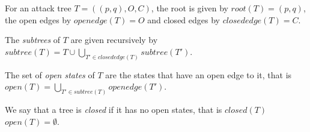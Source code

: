 \begin{definition}
  For an attack tree $T = ((p,q),O,C)$, the root is given by $root(T) = (p,q)$,
  the open edges by $openedge(T) = O$ and closed edges by $closededge(T) = C$. %

  The \emph{subtrees} of $T$ are given recursively by
  $subtree(T) = T ∪ ⋃_{T' ∈ closededge(T)} subtree(T')$.
  
  The set of \emph{open states} of $T$ are the states that
  have an open edge to it, that is
  $open(T) = ⋃_{T' ∈ subtree(T)} openedge(T')$.
  
  We say that a tree is \emph{closed} if it has no open states, that is
  $closed(T)$ \iff $open(T) = ∅$.


  


\end{definition}

